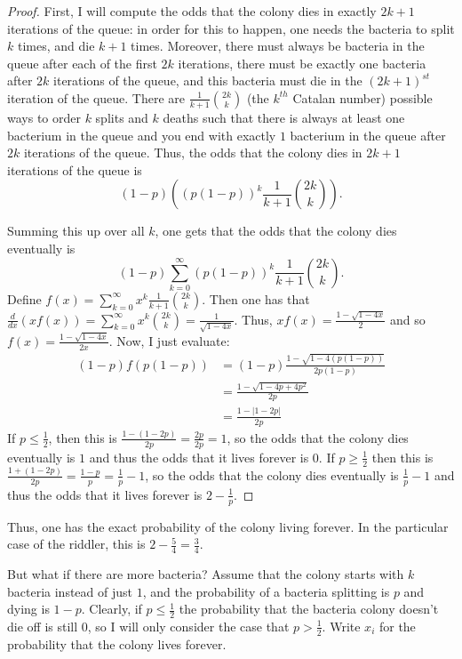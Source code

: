 \documentclass[11pt]{article}
\theoremstyle{definition}
\begin{document}
\begin{proof}
First, I will compute the odds that the colony dies in exactly $2k+1$ iterations of the queue: in order for this to happen, one needs the bacteria to split $k$ times, and die $k+1$ times.  Moreover, there must always be bacteria in the queue after each of the first $2k$ iterations, there must be exactly one bacteria after $2k$ iterations of the queue, and this bacteria must die in the $(2k+1)^{st}$ iteration of the queue.  There are $\frac{1}{k+1}\binom{2k}{k}$ (the $k^{th}$ Catalan number) possible ways to order $k$ splits and $k$ deaths such that there is always at least one bacterium in the queue and you end with exactly $1$ bacterium in the queue after $2k$ iterations of the queue.  Thus, the odds that the colony dies in $2k+1$ iterations of the queue is $$(1-p)\left(\left(p(1-p)\right)^k\frac{1}{k+1}\binom{2k}{k}\right).$$

Summing this up over all $k$, one gets that the odds that the colony dies eventually is $$(1-p)\sum_{k = 0}^{\infty} \left(p(1-p)\right)^k\frac{1}{k+1}\binom{2k}{k}.$$  Define $f(x) = \displaystyle{\sum_{k=0}^{\infty} x^k\frac{1}{k+1}\binom{2k}{k}}$.  Then one has that $\frac{d}{dx}(xf(x)) = \displaystyle{\sum_{k=0}^{\infty} x^k\binom{2k}{k} = \frac{1}{\sqrt{1-4x}}}$.  Thus, $xf(x) =  \frac{1-\sqrt{1-4x}}{2}$ and so $f(x) = \frac{1-\sqrt{1-4x}}{2x}$.  Now, I just evaluate: 
\begin{align*}
(1-p)f(p(1-p)) & = (1-p)\frac{1-\sqrt{1-4(p(1-p))}}{2p(1-p)} \\
& = \frac{1-\sqrt{1-4p+4p^2}}{2p} \\
& = \frac{1 - |1-2p|}{2p}
\end{align*}
If $p \leq \frac{1}{2}$, then this is $\frac{1-(1-2p)}{2p} = \frac{2p}{2p} = 1$, so the odds that the colony dies eventually is $1$ and thus the odds that it lives forever is $0$.  If $p \geq \frac{1}{2}$ then this is $\frac{1+(1-2p)}{2p} = \frac{1-p}{p} = \frac{1}{p} - 1$, so the odds that the colony dies eventually is $\frac{1}{p} - 1$ and thus the odds that it lives forever is $2-\frac{1}{p}$.
\end{proof}
Thus, one has the exact probability of the colony living forever.  In the particular case of the riddler, this is $2-\frac{5}{4} = \frac{3}{4}$.

But what if there are more bacteria?  Assume that the colony starts with $k$ bacteria instead of just $1$, and the probability of a bacteria splitting is $p$ and dying is $1-p$.  Clearly, if $p \leq \frac{1}{2}$ the probability that the bacteria colony doesn't die off is still $0$, so I will only consider the case that $p > \frac{1}{2}$.  Write $x_i$ for the probability that the colony lives forever.
\end{document}
